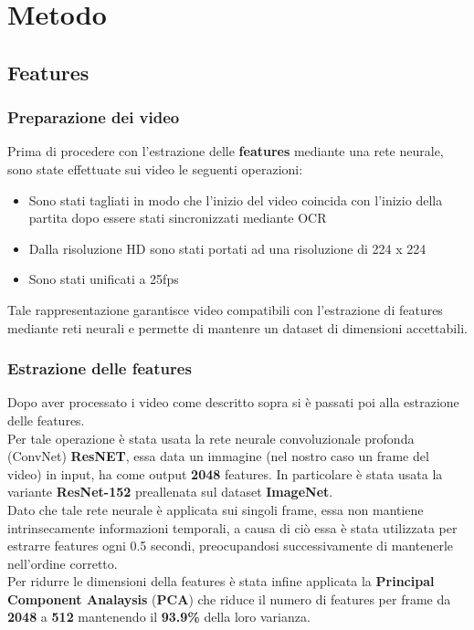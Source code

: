 \chapter{Metodo}\label{ch:chapter1}
\section{Features}
\subsection{Preparazione dei video}
Prima di procedere con l'estrazione delle \textbf{features} mediante una rete neurale, sono state effettuate sui video le seguenti operazioni:
\begin{itemize}
\item Sono stati tagliati in modo che l'inizio del video coincida con l'inizio della partita dopo essere stati sincronizzati mediante OCR
\item Dalla risoluzione HD sono stati portati ad una risoluzione di 224 x 224
\item Sono stati unificati a 25fps
\end{itemize}
Tale rappresentazione garantisce video compatibili con l'estrazione di features mediante reti neurali e permette di mantenre un dataset di dimensioni accettabili.
\subsection{Estrazione delle features}
Dopo aver processato i video come descritto sopra si è passati poi alla estrazione delle features.
\\Per tale operazione è stata usata la rete neurale convoluzionale profonda (ConvNet) \textbf{ResNET}, essa data un immagine (nel nostro caso un frame del video) in input, ha come output \textbf{2048} features. In particolare è stata usata la variante \textbf{ResNet-152} preallenata sul dataset \textbf{ImageNet}.
\\Dato che tale rete neurale è applicata sui singoli frame, essa non mantiene intrinsecamente informazioni temporali, a causa di ciò essa è stata utilizzata per estrarre features ogni 0.5 secondi, preocupandosi successivamente di mantenerle nell'ordine corretto.
\\Per ridurre le dimensioni della features è stata infine applicata la \textbf{Principal Component Analaysis} (\textbf{PCA}) che riduce il numero di features per frame da \textbf{2048} a \textbf{512} mantenendo il \textbf{93.9\%} della loro varianza.

